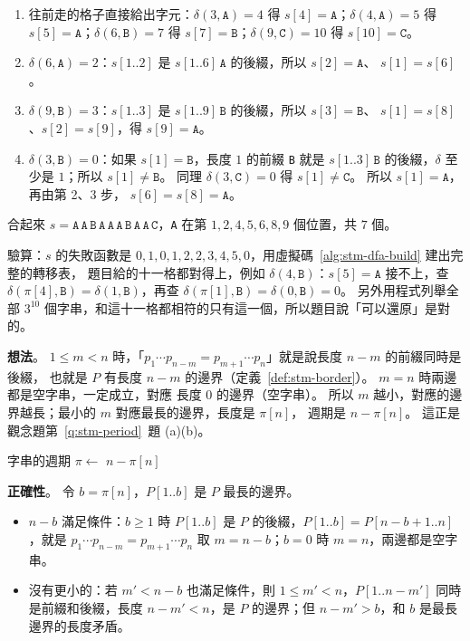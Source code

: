 \begin{enumerate}
\item 往前走的格子直接給出字元：$\delta(3, \mathtt{A}) = 4$ 得 $s[4] = \mathtt{A}$；$\delta(4, \mathtt{A}) = 5$
得 $s[5] = \mathtt{A}$；$\delta(6, \mathtt{B}) = 7$ 得 $s[7] = \mathtt{B}$；$\delta(9, \mathtt{C}) = 10$ 得
$s[10] = \mathtt{C}$。
\item $\delta(6, \mathtt{A}) = 2$：$s[1..2]$ 是 $s[1..6]\,\mathtt{A}$ 的後綴，所以 $s[2] = \mathtt{A}$、
$s[1] = s[6]$。
\item $\delta(9, \mathtt{B}) = 3$：$s[1..3]$ 是 $s[1..9]\,\mathtt{B}$ 的後綴，所以 $s[3] = \mathtt{B}$、
$s[1] = s[8]$、$s[2] = s[9]$，得 $s[9] = \mathtt{A}$。
\item $\delta(3, \mathtt{B}) = 0$：如果 $s[1] = \mathtt{B}$，長度 $1$ 的前綴 \texttt{B} 就是
$s[1..3]\,\mathtt{B}$ 的後綴，$\delta$ 至少是 $1$；所以 $s[1] \ne \mathtt{B}$。 同理
$\delta(3, \mathtt{C}) = 0$ 得 $s[1] \ne \mathtt{C}$。 所以 $s[1] = \mathtt{A}$，再由第 2、3 步，
$s[6] = s[8] = \mathtt{A}$。
\end{enumerate}

合起來 $s = \mathtt{A\,A\,B\,A\,A\,A\,B\,A\,A\,C}$，\texttt{A} 在第 $1, 2, 4, 5, 6, 8, 9$ 個位置，共 $7$ 個。

驗算：$s$ 的失敗函數是 $0, 1, 0, 1, 2, 2, 3, 4, 5, 0$，用虛擬碼~\ref{alg:stm-dfa-build} 建出完整的轉移表，
題目給的十一格都對得上，例如 $\delta(4, \mathtt{B})$：$s[5] = \mathtt{A}$ 接不上，查
$\delta(\pi[4], \mathtt{B}) = \delta(1, \mathtt{B})$，再查 $\delta(\pi[1], \mathtt{B}) = \delta(0, \mathtt{B}) = 0$。
另外用程式列舉全部 $3^{10}$ 個字串，和這十一格都相符的只有這一個，所以題目說「可以還原」是對的。

\textbf{想法}。 $1 \le m < n$ 時，「$p_1 \cdots p_{n-m} = p_{m+1} \cdots p_n$」就是說長度 $n - m$ 的前綴同時是後綴，
也就是 $P$ 有長度 $n - m$ 的邊界（定義~\ref{def:stm-border}）。 $m = n$ 時兩邊都是空字串，一定成立，對應
長度 $0$ 的邊界（空字串）。 所以 $m$ 越小，對應的邊界越長；最小的 $m$ 對應最長的邊界，長度是 $\pi[n]$，
週期是 $n - \pi[n]$。 這正是觀念題第~\ref{q:stm-period}~題 (a)(b)。

\begin{pseudo}[label=alg:stm-px-period]{字串的週期}
    \State $\pi \gets$ 
    \State \Return $n - \pi[n]$
\EndFunction
\end{pseudo}

\textbf{正確性}。 令 $b = \pi[n]$，$P[1..b]$ 是 $P$ 最長的邊界。
\begin{itemize}
\item $n - b$ 滿足條件：$b \ge 1$ 時 $P[1..b]$ 是 $P$ 的後綴，$P[1..b] = P[n - b + 1 .. n]$，就是
$p_1 \cdots p_{n-m} = p_{m+1} \cdots p_n$ 取 $m = n - b$；$b = 0$ 時 $m = n$，兩邊都是空字串。
\item 沒有更小的：若 $m' < n - b$ 也滿足條件，則 $1 \le m' < n$，$P[1..n - m']$ 同時是前綴和後綴，長度
$n - m' < n$，是 $P$ 的邊界；但 $n - m' > b$，和 $b$ 是最長邊界的長度矛盾。
\end{itemize}

